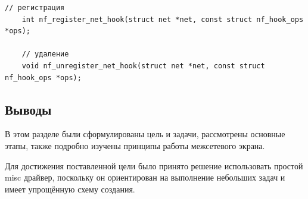 \begin{lstlisting}[caption = {Функции для регистрации и удаления хук-функций}, label=lst:hook_reg]
	// регистрация
	int nf_register_net_hook(struct net *net, const struct nf_hook_ops *ops);
	
	// удаление
	void nf_unregister_net_hook(struct net *net, const struct nf_hook_ops *ops);
\end{lstlisting}

\subsection{Выводы}
В этом разделе были сформулированы цель и задачи, рассмотрены основные этапы, также подробно изучены принципы работы межсетевого экрана. 

Для достижения поставленной цели было принято решение использовать простой misc драйвер, поскольку он ориентирован на выполнение небольших задач и имеет упрощённую схему создания.


 